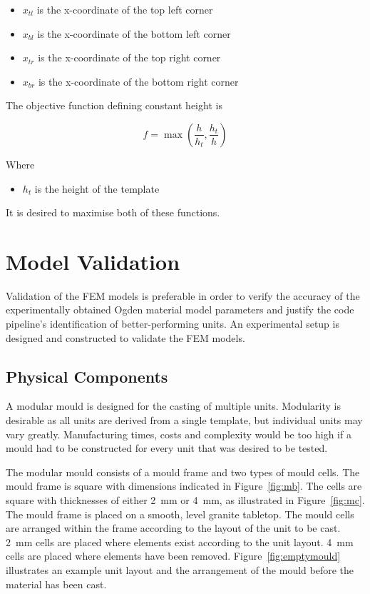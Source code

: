 \begin{itemize}
	\item $x_{tl}$ is the x-coordinate of the top left corner
	\item $x_{bl}$ is the x-coordinate of the bottom left corner
	\item $x_{tr}$ is the x-coordinate of the top right corner
	\item $x_{br}$ is the x-coordinate of the bottom right corner
\end{itemize}

The objective function defining constant height is

\begin{equation}
	f=\max\left (\frac{h}{h_{t}},\frac{h_{t}}{h} \right )
\end{equation}

Where

\begin{itemize}
	\item $h_{t}$ is the height of the template
\end{itemize}

It is desired to maximise both of these functions.

\section{Model Validation}
\label{sec:MV}

Validation of the FEM models is preferable in order to verify the accuracy of the experimentally obtained Ogden material model parameters and justify the code pipeline's identification of better-performing units. An experimental setup is designed and constructed to validate the FEM models.

\subsection{Physical Components}
\label{ssec:pc}

A modular mould is designed for the casting of multiple units. Modularity is desirable as all units are derived from a single template, but individual units may vary greatly. Manufacturing times, costs and complexity would be too high if a mould had to be constructed for every unit that was desired to be tested.

The modular mould consists of a mould frame and two types of mould cells. The mould frame is square with dimensions indicated in Figure~\ref{fig:mb}. The cells are square with thicknesses of either \SI{2}{mm} or \SI{4}{mm}, as illustrated in Figure~\ref{fig:mc}. The mould frame is placed on a smooth, level granite tabletop. The mould cells are arranged within the frame according to the layout of the unit to be cast. \SI{2}{mm} cells are placed where elements exist according to the unit layout. \SI{4}{mm} cells are placed where elements have been removed. Figure~\ref{fig:emptymould} illustrates an example unit layout and the arrangement of the mould before the material has been cast.

